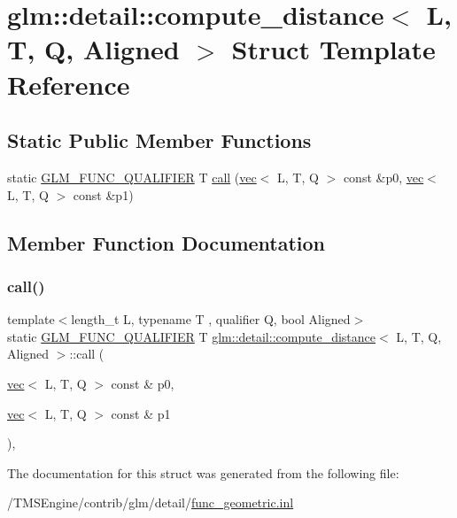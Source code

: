\hypertarget{structglm_1_1detail_1_1compute__distance}{}\section{glm\+:\+:detail\+:\+:compute\+\_\+distance$<$ L, T, Q, Aligned $>$ Struct Template Reference}
\label{structglm_1_1detail_1_1compute__distance}
\subsection*{Static Public Member Functions}
\begin{DoxyCompactItemize}
\item 
static \hyperlink{setup_8hpp_a33fdea6f91c5f834105f7415e2a64407}{G\+L\+M\+\_\+\+F\+U\+N\+C\+\_\+\+Q\+U\+A\+L\+I\+F\+I\+ER} T \hyperlink{structglm_1_1detail_1_1compute__distance_ac6bc3143c4460c61c56db42c2df5a8f8}{call} (\hyperlink{structglm_1_1vec}{vec}$<$ L, T, Q $>$ const \&p0, \hyperlink{structglm_1_1vec}{vec}$<$ L, T, Q $>$ const \&p1)
\end{DoxyCompactItemize}


\subsection{Member Function Documentation}
\mbox{\label{structglm_1_1detail_1_1compute__distance_ac6bc3143c4460c61c56db42c2df5a8f8}} 
\subsubsection{\texorpdfstring{call()}{call()}}
{\footnotesize\ttfamily template$<$length\+\_\+t L, typename T , qualifier Q, bool Aligned$>$ \\
static \hyperlink{setup_8hpp_a33fdea6f91c5f834105f7415e2a64407}{G\+L\+M\+\_\+\+F\+U\+N\+C\+\_\+\+Q\+U\+A\+L\+I\+F\+I\+ER} T \hyperlink{structglm_1_1detail_1_1compute__distance}{glm\+::detail\+::compute\+\_\+distance}$<$ L, T, Q, Aligned $>$\+::call (\begin{DoxyParamCaption}\item[{\hyperlink{structglm_1_1vec}{vec}$<$ L, T, Q $>$ const \&}]{p0,  }\item[{\hyperlink{structglm_1_1vec}{vec}$<$ L, T, Q $>$ const \&}]{p1 }\end{DoxyParamCaption})\hspace{0.3cm}{\ttfamily [inline]}, {\ttfamily [static]}}



The documentation for this struct was generated from the following file\+:\begin{DoxyCompactItemize}
\item 
/\+T\+M\+S\+Engine/contrib/glm/detail/\hyperlink{func__geometric_8inl}{func\+\_\+geometric.\+inl}\end{DoxyCompactItemize}
